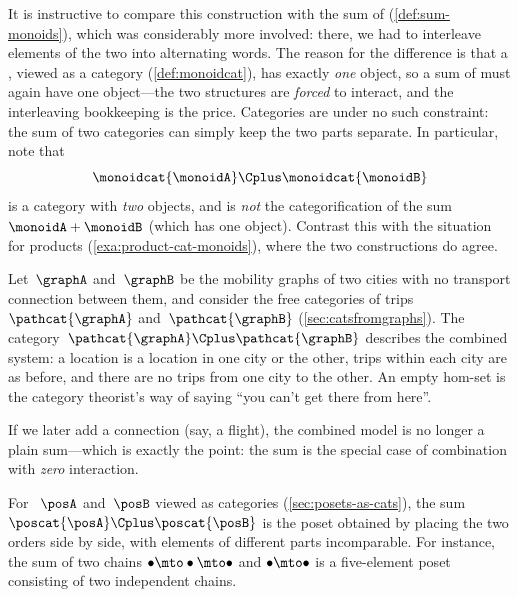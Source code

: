 \begin{remark}
    \label{rem:sum-cats-vs-sum-monoids}
    It is instructive to compare this construction with the sum of  (\cref{def:sum-monoids}), which was considerably more involved: there, we had to interleave elements of the two  into alternating words.
    The reason for the difference is that a , viewed as a category (\cref{def:monoidcat}), has exactly \emph{one} object, so a sum of  must again have one object---the two structures are \emph{forced} to interact, and the interleaving bookkeeping is the price.
    Categories are under no such constraint: the sum of two categories can simply keep the two parts separate.
    In particular, note that
    \begin{equation}
        \monoidcat{\monoidA} \Cplus \monoidcat{\monoidB}
    \end{equation}
    is a category with \emph{two} objects, and is \emph{not} the categorification of the sum~$\monoidA + \monoidB$ (which has one object).
    Contrast this with the situation for products (\cref{exa:product-cat-monoids}), where the two constructions do agree.
\end{remark}

\begin{example}
    \label{exa:sum-cat-two-cities}
    Let~$\graphA$ and~$\graphB$ be the mobility graphs of two cities with no transport connection between them, and consider the free categories of trips~$\pathcat{\graphA}$ and~$\pathcat{\graphB}$ (\cref{sec:catsfromgraphs}).
    The category~$\pathcat{\graphA} \Cplus \pathcat{\graphB}$ describes the combined system: a location is a location in one city or the other, trips within each city are as before, and there are no trips from one city to the other.
    An empty hom-set is the category theorist's way of saying ``you can't get there from here''.

    If we later add a connection (say, a flight), the combined model is no longer a plain sum---which is exactly the point: the sum is the special case of combination with \emph{zero} interaction.
\end{example}

\begin{example}
    \label{exa:sum-cat-posets}
    For ~$\posA$ and~$\posB$ viewed as categories (\cref{sec:posets-as-cats}), the sum~$\poscat{\posA} \Cplus \poscat{\posB}$ is the poset obtained by placing the two orders side by side, with elements of different parts incomparable.
    For instance, the sum of two chains $\bullet \mto \bullet \mto \bullet$ and $\bullet \mto \bullet$ is a five-element poset consisting of two independent chains.
\end{example}

